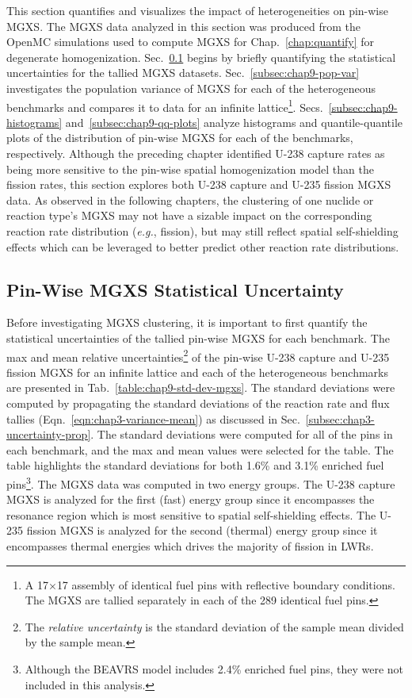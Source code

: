This section quantifies and visualizes the impact of heterogeneities on pin-wise \ac{MGXS}. The \ac{MGXS} data analyzed in this section was produced from the OpenMC simulations used to compute \ac{MGXS} for Chap.~\ref{chap:quantify} for degenerate homogenization. Sec.~\ref{subsec:chap9-mgxs-uncertainty} begins by briefly quantifying the statistical uncertainties for the tallied \ac{MGXS} datasets. Sec.~\ref{subsec:chap9-pop-var} investigates the population variance of \ac{MGXS} for each of the heterogeneous benchmarks and compares it to data for an infinite lattice\footnote{A 17$\times$17 assembly of identical fuel pins with reflective boundary conditions. The \ac{MGXS} are tallied separately in each of the 289 identical fuel pins.}. Secs.~\ref{subsec:chap9-histograms} and~\ref{subsec:chap9-qq-plots} analyze histograms and quantile-quantile plots of the distribution of pin-wise \ac{MGXS} for each of the benchmarks, respectively. Although the preceding chapter identified U-238 capture rates as being more sensitive to the pin-wise spatial homogenization model than the fission rates, this section explores both U-238 capture and U-235 fission \ac{MGXS} data. As observed in the following chapters, the clustering of one nuclide or reaction type's \ac{MGXS} may not have a sizable impact on the corresponding reaction rate distribution (\textit{e.g.}, fission), but may still reflect spatial self-shielding effects which can be leveraged to better predict other reaction rate distributions.

\subsection{Pin-Wise MGXS Statistical Uncertainty}
\label{subsec:chap9-mgxs-uncertainty}

Before investigating \ac{MGXS} clustering, it is important to first quantify the statistical uncertainties of the tallied pin-wise \ac{MGXS} for each benchmark. The max and mean relative uncertainties\footnote{The \textit{relative uncertainty} is the standard deviation of the sample mean divided by the sample mean.} of the pin-wise U-238 capture and U-235 fission \ac{MGXS} for an infinite lattice and each of the heterogeneous benchmarks are presented in Tab.~\ref{table:chap9-std-dev-mgxs}. The standard deviations were computed by propagating the standard deviations of the reaction rate and flux tallies (Eqn.~\ref{eqn:chap3-variance-mean}) as discussed in Sec.~\ref{subsec:chap3-uncertainty-prop}. The standard deviations were computed for all of the pins in each benchmark, and the max and mean values were selected for the table. The table highlights the standard deviations for both 1.6\% and 3.1\% enriched fuel pins\footnote{Although the \ac{BEAVRS} model includes 2.4\% enriched fuel pins, they were not included in this analysis.}. The \ac{MGXS} data was computed in two energy groups. The U-238 capture \ac{MGXS} is analyzed for the first (fast) energy group since it encompasses the resonance region which is most sensitive to spatial self-shielding effects. The U-235 fission \ac{MGXS} is analyzed for the second (thermal) energy group since it encompasses thermal energies which drives the majority of fission in \acp{LWR}.

